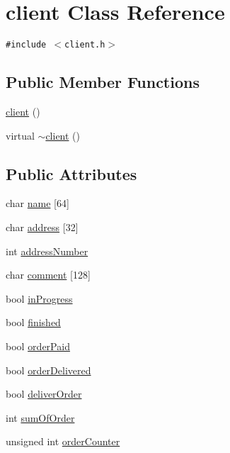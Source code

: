 \hypertarget{classclient}{
\section{client Class Reference}
\label{classclient}
}
{\tt \#include $<$client.h$>$}

\subsection*{Public Member Functions}
\begin{CompactItemize}
\item 
\hyperlink{classclient_b53a10e7f29eac1a359e54efc484e96e}{client} ()
\item 
virtual \hyperlink{classclient_f615a256c40006da0684c8baae2da7cb}{$\sim$client} ()
\end{CompactItemize}
\subsection*{Public Attributes}
\begin{CompactItemize}
\item 
char \hyperlink{classclient_275f6727040426992bb1c8e247d38cde}{name} \mbox{[}64\mbox{]}
\item 
char \hyperlink{classclient_06a8d016fa013b9fc60bcc24da937701}{address} \mbox{[}32\mbox{]}
\item 
int \hyperlink{classclient_6ab3066cc6893cf6833b2871ecdebaf2}{address\-Number}
\item 
char \hyperlink{classclient_34824e2772f77c71f2d3778354d68b1c}{comment} \mbox{[}128\mbox{]}
\item 
bool \hyperlink{classclient_292db71ff1a82008b52bc6f74bd0419e}{in\-Progress}
\item 
bool \hyperlink{classclient_a5d7ceb2c59b8cee46c2953fec9abc19}{finished}
\item 
bool \hyperlink{classclient_8498e9222401c9034d4e5a26970a3400}{order\-Paid}
\item 
bool \hyperlink{classclient_63c4891c26137238d3075aa6a395c235}{order\-Delivered}
\item 
bool \hyperlink{classclient_48e3b11844a6747c24de0ff69018f775}{deliver\-Order}
\item 
int \hyperlink{classclient_89b86d03136dc2f044d7669137baf6b5}{sum\-Of\-Order}
\item 
unsigned int \hyperlink{classclient_25f95fa8cae78c29d5fe90cb9879944a}{order\-Counter}
\end{CompactItemize}
